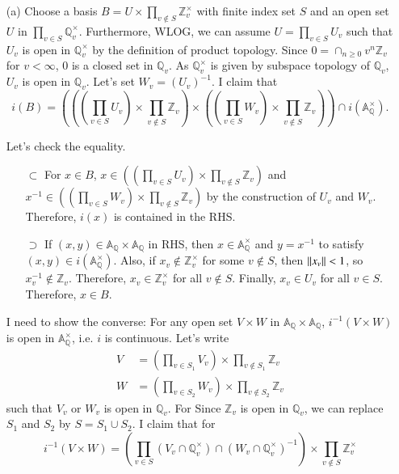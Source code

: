 \documentclass[a4paper, 12pt]{article}
\theoremstyle{Mydefinition}
\theoremstyle{Mytheorem}
\begin{document}
\begin{enumerate}
    \item[(a)] Choose a basis $B = U\times \prod_{v\not\in S}\mathbb{Z}_v^\times$ with finite index set $S$ and an open set $U$ in $\prod_{v\in S}\mathbb{Q}_v^\times$. Furthermore, WLOG, we can assume $U = \prod_{v\in S} U_v$ such that $U_v$ is open in $\mathbb{Q}_v^\times$ by the definition of product topology. Since $0 = \cap_{n\geq 0}v^n \mathbb{Z}_v$ for $v<\infty$, $0$ is a closed set in $\mathbb{Q}_v$. As $\mathbb{Q}_v^\times$ is given by subspace topology of $\mathbb{Q}_v$, $U_v$ is open in $\mathbb{Q}_v$. Let's set $W_v = (U_v)^{-1}$. I claim that 
\begin{equation}
    i(B) = \left(\left(\left(\prod_{v\in S} U_v\right)\times \prod_{v\not\in S} \mathbb{Z}_v\right)\times \left(\left(\prod_{v\in S} W_v\right)\times \prod_{v\not\in S} \mathbb{Z}_v\right)\right)\cap i\left(\mathbb{A}_\mathbb{Q}^\times\right).
\end{equation}

Let's check the equality.
\begin{enumerate}
    \item[$\subset$] For $x\in B$, $x\in \left(\left(\prod_{v\in S} U_v\right)\times \prod_{v\not\in S} \mathbb{Z}_v\right)$ and $x^{-1}\in \left(\left(\prod_{v\in S} W_v\right)\times \prod_{v\not\in S} \mathbb{Z}_v\right)$ by the construction of $U_v$ and $W_v$. Therefore, $i(x)$ is contained in the RHS.
    
    \item[$\supset$] If $(x,y)\in \mathbb{A}_\mathbb{Q}\times \mathbb{A}_\mathbb{Q}$ in RHS, then $x\in \mathbb{A}_\mathbb{Q}^\times$ and $y= x^{-1}$ to satisfy $(x,y)\in i(\mathbb{A}_\mathbb{Q}^\times)$. Also, if $x_v\not\in \mathbb{Z}_v^\times$ for some $v\not\in S$, then $\norm{x_v}<1$, so $x_v^{-1}\not\in \mathbb{Z}_v$. Therefore, $x_v\in \mathbb{Z}_v^\times$ for all $v\not\in S$. Finally, $x_v\in U_v$ for all $v\in S$. Therefore, $x\in B$.
\end{enumerate}

I need to show the converse: For any open set $V\times W$ in $\mathbb{A}_\mathbb{Q}\times \mathbb{A}_\mathbb{Q}$, $i^{-1}(V\times W)$ is open in $\mathbb{A}_\mathbb{Q}^\times$, i.e. $i$ is continuous. Let's write
\begin{equation}
\begin{split}
    V &=\left(\prod_{v\in S_1} V_v\right)\times \prod_{v\not\in S_1} \mathbb{Z}_v\\
    W &=\left(\prod_{v\in S_2} W_v\right)\times \prod_{v\not\in S_2} \mathbb{Z}_v
\end{split}
\end{equation}
such that $V_v$ or $W_v$ is open in $\mathbb{Q}_v$. For Since $\mathbb{Z}_v$ is open in $\mathbb{Q}_v$, we can replace $S_1$ and $S_2$ by $S=S_1\cup S_2$. I claim that for 
\begin{equation}
    i^{-1}(V\times W) = \left(\prod_{v\in S} \left(V_v \cap \mathbb{Q}_v^\times\right)\cap \left(W_v \cap \mathbb{Q}_v^\times\right)^{-1}\right)\times \prod_{v\not\in S} \mathbb{Z}^\times_v
\end{equation}


\end{enumerate}
\end{document}
